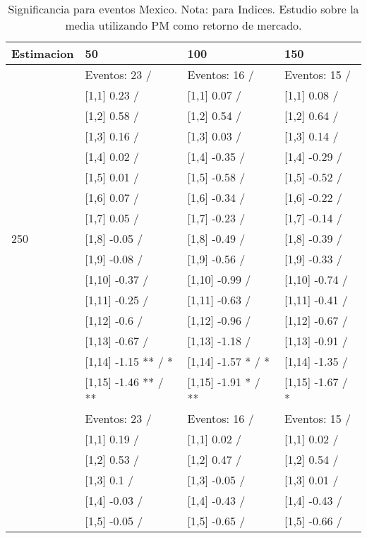 \begin{table}

\caption{Significancia para eventos Mexico. Nota: para Indices. Estudio sobre la media utilizando PM como retorno de mercado.}
\centering
\begin{tabular}[t]{llll}
\toprule
Estimacion & 50 & 100 & 150\\
\midrule
 & Eventos:  23 / & Eventos:  16 / & Eventos:  15 /\\
 & {}[1,1] 0.23  / & {}[1,1] 0.07  / & {}[1,1] 0.08  /\\
 & {}[1,2] 0.58  / & {}[1,2] 0.54  / & {}[1,2] 0.64  /\\
 & {}[1,3] 0.16  / & {}[1,3] 0.03  / & {}[1,3] 0.14  /\\
 & {}[1,4] 0.02  / & {}[1,4] -0.35  / & {}[1,4] -0.29  /\\
\addlinespace
 & {}[1,5] 0.01  / & {}[1,5] -0.58  / & {}[1,5] -0.52  /\\
 & {}[1,6] 0.07  / & {}[1,6] -0.34  / & {}[1,6] -0.22  /\\
 & {}[1,7] 0.05  / & {}[1,7] -0.23  / & {}[1,7] -0.14  /\\
250 & {}[1,8] -0.05  / & {}[1,8] -0.49  / & {}[1,8] -0.39  /\\
 & {}[1,9] -0.08  / & {}[1,9] -0.56  / & {}[1,9] -0.33  /\\
\addlinespace
 & {}[1,10] -0.37  / & {}[1,10] -0.99  / & {}[1,10] -0.74  /\\
 & {}[1,11] -0.25  / & {}[1,11] -0.63  / & {}[1,11] -0.41  /\\
 & {}[1,12] -0.6  / & {}[1,12] -0.96  / & {}[1,12] -0.67  /\\
 & {}[1,13] -0.67  / & {}[1,13] -1.18  / & {}[1,13] -0.91  /\\
 & {}[1,14] -1.15 ** / * & {}[1,14] -1.57 * / * & {}[1,14] -1.35  /\\
\addlinespace
 & {}[1,15] -1.46 ** / ** & {}[1,15] -1.91 * / ** & {}[1,15] -1.67  / *\\
 & Eventos:  23 / & Eventos:  16 / & Eventos:  15 /\\
 & {}[1,1] 0.19  / & {}[1,1] 0.02  / & {}[1,1] 0.02  /\\
 & {}[1,2] 0.53  / & {}[1,2] 0.47  / & {}[1,2] 0.54  /\\
 & {}[1,3] 0.1  / & {}[1,3] -0.05  / & {}[1,3] 0.01  /\\
\addlinespace
 & {}[1,4] -0.03  / & {}[1,4] -0.43  / & {}[1,4] -0.43  /\\
 & {}[1,5] -0.05  / & {}[1,5] -0.65  / & {}[1,5] -0.66  /\\

\end{tabular}
\end{table}
